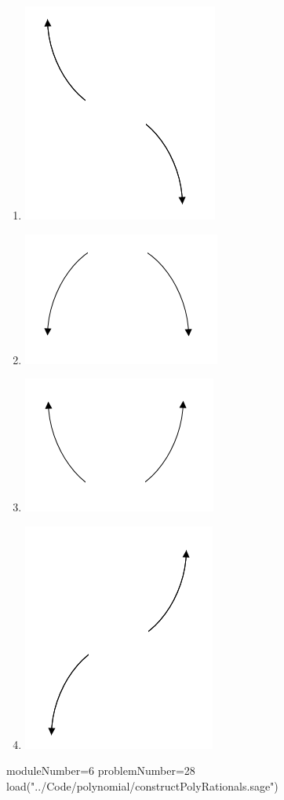 \documentclass[14pt]{article}
\begin{document}
\begin{enumerate}
{\begin{multicols}{4}
	\begin{enumerate}[label=\Alph*.]
		\item \begin{center} \includegraphics[width=.2\textwidth]{../Figures/endBehaviorNegativeOddA} \end{center}
    \columnbreak
		\item \begin{center} \includegraphics[width=.2\textwidth]{../Figures/endBehaviorNegativeEvenA}\end{center}
    \columnbreak
		\item \begin{center} \includegraphics[width=.2\textwidth]{../Figures/endBehaviorPositiveEvenA}\end{center}
    \columnbreak
		\item \begin{center} \includegraphics[width=.2\textwidth]{../Figures/endBehaviorPositiveOddA}\end{center}
	\end{enumerate}
\end{multicols}
}

\begin{sagesilent}
moduleNumber=6
problemNumber=28
load("../Code/polynomial/constructPolyRationals.sage")
\end{sagesilent}


\end{enumerate}
\end{document}
